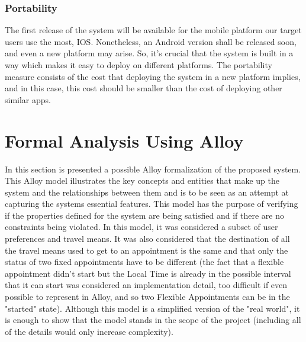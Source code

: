\documentclass[12pt]{article}
\begin{document}
\subsubsection{Portability}
The first release of the system will be available for the mobile platform our target users use the most, IOS. Nonetheless, an Android version shall be released soon, and even a new platform may arise. So, it's crucial that the system is built in a way which makes it easy to deploy on different platforms. The portability measure consists of the cost that deploying the system in a new platform implies, and in this case, this cost should be smaller than the cost of deploying other similar apps.

\section{Formal Analysis Using Alloy}
In this section is presented a possible Alloy formalization of the proposed system. This Alloy model illustrates the key concepts and entities that make up the system and the relationships between them and is to be seen as an attempt at capturing the systems essential features.
This model has the purpose of verifying if the properties defined for the system are being satisfied and if there are no constraints being violated.
In this model, it was considered a subset of user preferences and travel means. It was also considered that the destination of all the travel means used to get to an appointment is the same and that only the status of two fixed appointments have to be different (the fact that a flexible appointment didn't start but the Local Time is already in the possible interval that it can start was considered an implementation detail, too difficult if even possible to represent in Alloy, and so two Flexible Appointments can be in the "started" state). Although this model is a simplified version of the "real world", it is enough to show that the model stands in the scope of the project (including all of the details would only increase complexity). 
\end{document}
